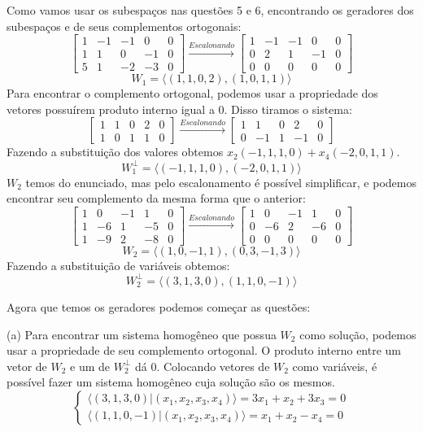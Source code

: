\documentclass{homework}
\begin{document}
\exercise*
Como vamos usar os subespaços nas questões 5 e 6, encontrando os geradores dos subespaços e de seus complementos ortogonais:
\[
\left [ \begin{array}{cccc|c}
1 & -1 & -1 & 0 & 0\\
1 & 1 & 0 & -1 & 0\\
5 & 1 & -2 & -3 & 0
\end{array} \right ] \xrightarrow{Escalonando}
\left [ \begin{array}{cccc|c}
1 & -1 & -1 & 0 & 0\\
0 & 2 & 1 & -1 & 0\\
0 & 0 & 0 & 0 & 0
\end{array} \right ]
\]
\[W_1 = \langle (1,1,0,2),(1,0,1,1)\rangle\]
Para encontrar o complemento ortogonal, podemos usar a propriedade dos vetores possuírem produto interno igual a 0. Disso tiramos o sistema:
\[
\left [ \begin{array}{cccc|c}
1 & 1 & 0 & 2 & 0\\
1 & 0 & 1 & 1 & 0
\end{array} \right ] \xrightarrow{Escalonando}
\left [ \begin{array}{cccc|c}
1 & 1 & 0 & 2 & 0\\
0 & -1 & 1 & -1 & 0
\end{array} \right ]
\]
Fazendo a substituição dos valores obtemos $x_2(-1,1,1,0)+x_4(-2,0,1,1)$.
\[W_1^\perp = \langle(-1,1,1,0),(-2,0,1,1)\rangle\]
$W_2$ temos do enunciado, mas pelo escalonamento é possível simplificar, e podemos encontrar seu complemento da mesma forma que o anterior:
\[
\left [ \begin{array}{cccc|c}
1 & 0 & -1 & 1 & 0\\
1 & -6 & 1 & -5 & 0\\
1 & -9 & 2 & -8 & 0
\end{array} \right ] \xrightarrow{Escalonando}
\left [ \begin{array}{cccc|c}
1 & 0 & -1 & 1 & 0\\
0 & -6 & 2 & -6 & 0\\
0 & 0 & 0 & 0 & 0
\end{array} \right ]
\]
\[W_2 = \langle(1,0,-1,1),(0,3,-1,3)\rangle\]
Fazendo a substituição de variáveis obtemos:
\[W_2^\perp = \langle(3,1,3,0),(1,1,0,-1)\rangle\]

Agora que temos os geradores podemos começar as questões:

(a) Para encontrar um sistema homogêneo que possua $W_2$ como solução, podemos usar a propriedade de seu complemento ortogonal. O produto interno entre um vetor de $W_2$ e um de $W_2^\perp$ dá 0. Colocando vetores de $W_2$ como variáveis, é possível fazer um sistema homogêneo cuja solução são os mesmos.
\[
\begin{cases}
\langle(3,1,3,0)|(x_1,x_2,x_3,x_4)\rangle = 3x_1 + x_2 + 3x_3 = 0\\
\langle(1,1,0,-1)|(x_1,x_2,x_3,x_4)\rangle = x_1 + x_2 - x_4 = 0
\end{cases}
\]
\end{document}
